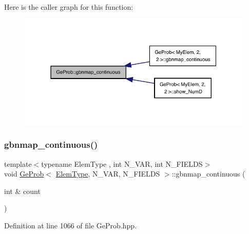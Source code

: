 Here is the caller graph for this function\+:
\nopagebreak
\begin{figure}[H]
\begin{center}
\leavevmode
\includegraphics[width=331pt]{classGeProb_aa2d34febad6985ceacd95ba6e10536f8_icgraph}
\end{center}
\end{figure}
\mbox{\label{classGeProb_a4a405a3f566e10cf77906d21606c97bd}} 
\subsubsection{\texorpdfstring{gbnmap\+\_\+continuous()}{gbnmap\_continuous()}\hspace{0.1cm}{\footnotesize\ttfamily [2/2]}}
{\footnotesize\ttfamily template$<$typename Elem\+Type , int N\+\_\+\+V\+AR, int N\+\_\+\+F\+I\+E\+L\+DS$>$ \\
void \hyperlink{classGeProb}{Ge\+Prob}$<$ \hyperlink{spectral_8h_aaa2c1a7b2d1b12c590d730fe6ac839fa}{Elem\+Type}, N\+\_\+\+V\+AR, N\+\_\+\+F\+I\+E\+L\+DS $>$\+::gbnmap\+\_\+continuous (\begin{DoxyParamCaption}\item[{int \&}]{count }\end{DoxyParamCaption})}



Definition at line 1066 of file Ge\+Prob.\+hpp.

\mbox{\label{classGeProb_a4ceec7b2e7cad8ba29dd8d751840a22b}} 
